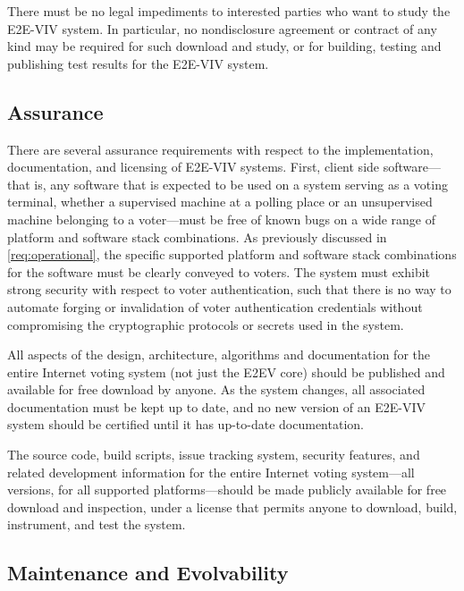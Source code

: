 There must be no legal impediments to interested parties who want to
study the E2E-VIV system. In particular, no nondisclosure agreement or
contract of any kind may be required for such download and study, or
for building, testing and publishing test results for the E2E-VIV
system.

\subsection{Assurance}

There are several assurance requirements with respect to the
implementation, documentation, and licensing of E2E-VIV
systems. First, client side software---that is, any software that is
expected to be used on a system serving as a voting terminal, whether
a supervised machine at a polling place or an unsupervised machine
belonging to a voter---must be free of known bugs on a wide range of
platform and software stack combinations. As previously discussed in
\autoref{req:operational}, the specific supported platform and
software stack combinations for the software must be clearly conveyed
to voters. The system must exhibit strong security with respect to
voter authentication, such that there is no way to automate forging or
invalidation of voter authentication credentials without compromising
the cryptographic protocols or secrets used in the system.

All aspects of the design, architecture, algorithms and documentation
for the entire Internet voting system (not just the E2EV core) should
be published and available for free download by anyone. As the system
changes, all associated documentation must be kept up to date, and no
new version of an E2E-VIV system should be certified until it has
up-to-date documentation. 

The source code, build scripts, issue tracking system, security
features, and related development information for the entire Internet
voting system---all versions, for all supported platforms---should be
made publicly available for free download and inspection, under a
license that permits anyone to download, build, instrument, and test
the system.

\subsection{Maintenance and Evolvability}

